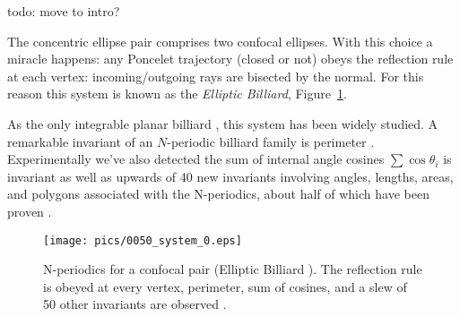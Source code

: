 todo: move to intro?

The concentric ellipse pair comprises two confocal ellipses. With this choice a miracle happens: any Poncelet trajectory (closed or not) obeys the reflection rule at each vertex: incoming/outgoing rays are bisected by the normal. For this reason this system is known as the {\em Elliptic Billiard},  Figure~\ref{fig:billiard}.

As the only integrable planar billiard \cite{kaloshin2018}, this system has been widely studied. A remarkable invariant of an $N$-periodic billiard family is perimeter \cite{sergei91,connes07}. Experimentally we've also detected the sum of internal angle cosines $\sum\cos{\theta_i}$ is invariant \cite{reznik19} as well as upwards of 40 new invariants \cite{reznik2020-forty} involving angles, lengths, areas, and polygons associated with the N-periodics, about half of which have been proven \cite{akopyan2020-invariants,bialy2020-invariants,caliz2020-area-product}.

\begin{figure}
    \centering
\texttt{[image: pics/0050\_system\_0.eps]}
    \caption{N-periodics for a confocal pair (Elliptic Billiard \cite{sergei91}). The reflection rule is obeyed at every vertex, perimeter, sum of cosines, and a slew of 50 other invariants are observed \cite{reznik19,reznik2020-forty}.}
    \label{fig:billiard}
\end{figure}